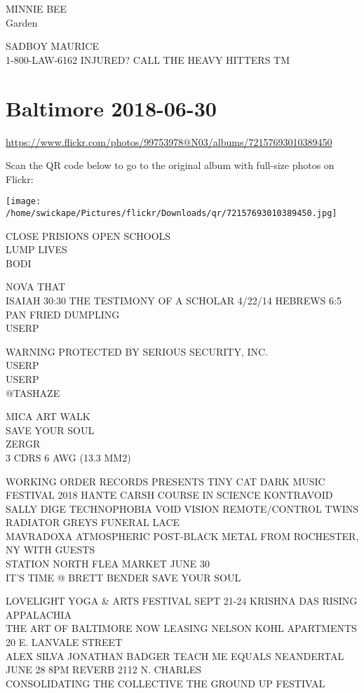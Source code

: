 \documentclass[10pt,letterpaper]{article}
\begin{document}
MINNIE BEE\\
Garden

SADBOY MAURICE\\
1{-}800{-}LAW{-}6162 INJURED?  CALL THE HEAVY HITTERS TM


\section*{Baltimore 2018-06-30}

\url{https://www.flickr.com/photos/99753978@N03/albums/72157693010389450}

Scan the QR code below to go to the original album with full-size photos on Flickr:

\texttt{[image: /home/swickape/Pictures/flickr/Downloads/qr/72157693010389450.jpg]}


CLOSE PRISIONS OPEN SCHOOLS\\
LUMP LIVES\\
BODI

NOVA THAT\\
ISAIAH 30:30 THE TESTIMONY OF A SCHOLAR 4/22/14 HEBREWS 6:5\\
PAN FRIED DUMPLING\\
USERP

WARNING PROTECTED BY SERIOUS SECURITY, INC.\\
USERP\\
USERP\\
@TASHAZE

MICA ART WALK\\
SAVE YOUR SOUL\\
ZERGR\\
3 CDRS 6 AWG (13.3 MM2)

WORKING ORDER RECORDS PRESENTS TINY CAT DARK MUSIC FESTIVAL 2018 HANTE CARSH COURSE IN SCIENCE KONTRAVOID SALLY DIGE TECHNOPHOBIA VOID VISION REMOTE/CONTROL TWINS RADIATOR GREYS FUNERAL LACE\\
MAVRADOXA ATMOSPHERIC POST{-}BLACK METAL FROM ROCHESTER, NY WITH GUESTS\\
STATION NORTH FLEA MARKET JUNE 30\\
IT'S TIME @ BRETT BENDER SAVE YOUR SOUL

LOVELIGHT YOGA \& ARTS FESTIVAL SEPT 21{-}24 KRISHNA DAS RISING APPALACHIA\\
THE ART OF BALTIMORE NOW LEASING NELSON KOHL APARTMENTS 20 E. LANVALE STREET\\
ALEX SILVA JONATHAN BADGER TEACH ME EQUALS NEANDERTAL JUNE 28 8PM REVERB 2112 N. CHARLES\\
CONSOLIDATING THE COLLECTIVE THE GROUND UP FESTIVAL
\end{document}
